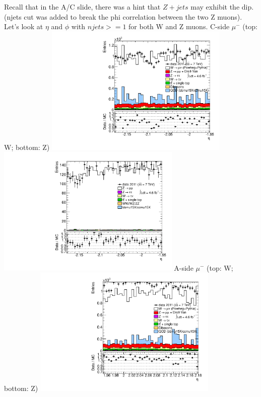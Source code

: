  {
Recall that in the A/C slide, there was a hint that $Z+jets$ may exhibit the dip. \\
(njets cut was added to break the phi correlation between the two Z muons).
Let's look at $\eta$ and $\phi$ with $njets>=1$ for both W and Z muons.
}
 {
\colb[T]
C-side $\mu^{-}$ (top: W; bottom: Z)
\centering
\includegraphics[width=0.66\textwidth]{dates/20130306/figures/both/Wnjets_10_C_stack_l_eta_NEG} \\
\includegraphics[width=0.66\textwidth]{dates/20130306/figures/both/Znjets_10_C_stack_lN_eta_ALL.pdf}
A-side $\mu^{-}$ (top: W; bottom: Z)
\centering
\includegraphics[width=0.66\textwidth]{dates/20130306/figures/both/Wnjets_10_A_stack_l_eta_NEG} \\
}
